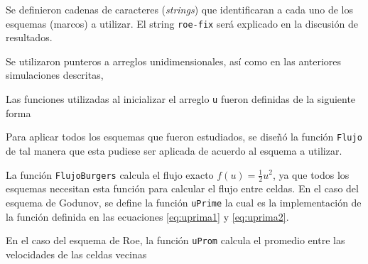 \documentclass[12pt]{article}
\begin{document}
	
	
	Se definieron cadenas de caracteres (\textit{strings}) que identificaran a cada uno de los esquemas (marcos) a utilizar. El string \texttt{roe-fix} será explicado en la discusión de resultados.
	
	
	Se utilizaron punteros a arreglos unidimensionales, así como en las anteriores simulaciones descritas,
	
	
	
	
	
	Las funciones utilizadas al inicializar el arreglo \texttt{u} fueron definidas de la siguiente forma
	
	
	
	Para aplicar todos los esquemas que fueron estudiados, se diseñó la función \texttt{Flujo} de tal manera que esta pudiese ser aplicada de acuerdo al esquema a utilizar.
 	
 	
 	
 	La función \texttt{FlujoBurgers} calcula el flujo exacto $f(u) = \frac{1}{2}u^{2}$, ya que todos los esquemas necesitan esta función para calcular el flujo entre celdas. En el caso del esquema de Godunov, se define la función \texttt{uPrime} la cual es la implementación de la función definida en las ecuaciones \ref{eq:uprima1} y \ref{eq:uprima2}.
 	
 	
 	
 	En el caso del esquema de Roe, la función \texttt{uProm} calcula el promedio entre las velocidades de las celdas vecinas
 	
\end{document}
